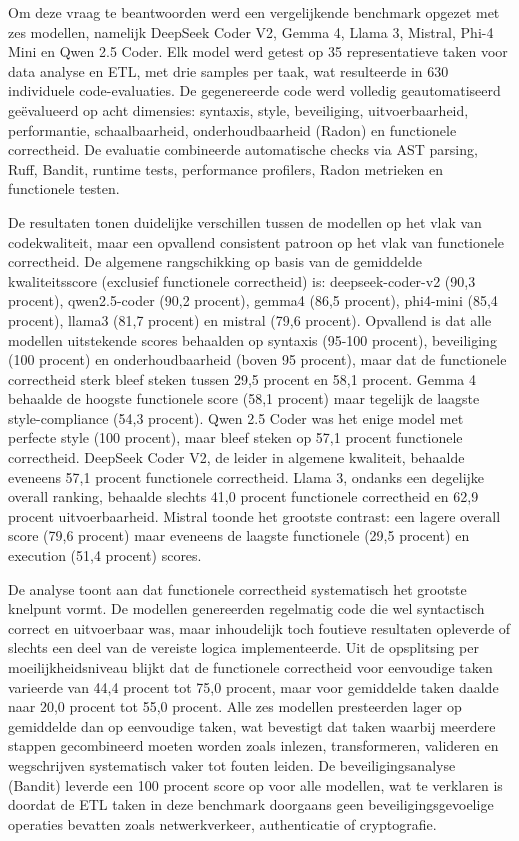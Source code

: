 Om deze vraag te beantwoorden werd een vergelijkende benchmark opgezet met zes modellen, namelijk DeepSeek Coder V2, Gemma 4, Llama 3, Mistral, Phi-4 Mini en Qwen 2.5 Coder. Elk model werd getest op 35 representatieve taken voor data analyse en ETL, met drie samples per taak, wat resulteerde in 630 individuele code-evaluaties. De gegenereerde code werd volledig geautomatiseerd geëvalueerd op acht dimensies: syntaxis, style, beveiliging, uitvoerbaarheid, performantie, schaalbaarheid, onderhoudbaarheid (Radon) en functionele correctheid. De evaluatie combineerde automatische checks via AST parsing, Ruff, Bandit, runtime tests, performance profilers, Radon metrieken en functionele testen.

De resultaten tonen duidelijke verschillen tussen de modellen op het vlak van codekwaliteit, maar een opvallend consistent patroon op het vlak van functionele correctheid. De algemene rangschikking op basis van de gemiddelde kwaliteitsscore (exclusief functionele correctheid) is: deepseek-coder-v2 (90,3 procent), qwen2.5-coder (90,2 procent), gemma4 (86,5 procent), phi4-mini (85,4 procent), llama3 (81,7 procent) en mistral (79,6 procent). Opvallend is dat alle modellen uitstekende scores behaalden op syntaxis (95-100 procent), beveiliging (100 procent) en onderhoudbaarheid (boven 95 procent), maar dat de functionele correctheid sterk bleef steken tussen 29,5 procent en 58,1 procent. Gemma 4 behaalde de hoogste functionele score (58,1 procent) maar tegelijk de laagste style-compliance (54,3 procent). Qwen 2.5 Coder was het enige model met perfecte style (100 procent), maar bleef steken op 57,1 procent functionele correctheid. DeepSeek Coder V2, de leider in algemene kwaliteit, behaalde eveneens 57,1 procent functionele correctheid. Llama 3, ondanks een degelijke overall ranking, behaalde slechts 41,0 procent functionele correctheid en 62,9 procent uitvoerbaarheid. Mistral toonde het grootste contrast: een lagere overall score (79,6 procent) maar eveneens de laagste functionele (29,5 procent) en execution (51,4 procent) scores.

De analyse toont aan dat functionele correctheid systematisch het grootste knelpunt vormt. De modellen genereerden regelmatig code die wel syntactisch correct en uitvoerbaar was, maar inhoudelijk toch foutieve resultaten opleverde of slechts een deel van de vereiste logica implementeerde. Uit de opsplitsing per moeilijkheidsniveau blijkt dat de functionele correctheid voor eenvoudige taken varieerde van 44,4 procent tot 75,0 procent, maar voor gemiddelde taken daalde naar 20,0 procent tot 55,0 procent. Alle zes modellen presteerden lager op gemiddelde dan op eenvoudige taken, wat bevestigt dat taken waarbij meerdere stappen gecombineerd moeten worden zoals inlezen, transformeren, valideren en wegschrijven systematisch vaker tot fouten leiden. De beveiligingsanalyse (Bandit) leverde een 100 procent score op voor alle modellen, wat te verklaren is doordat de ETL taken in deze benchmark doorgaans geen beveiligingsgevoelige operaties bevatten zoals netwerkverkeer, authenticatie of cryptografie.

